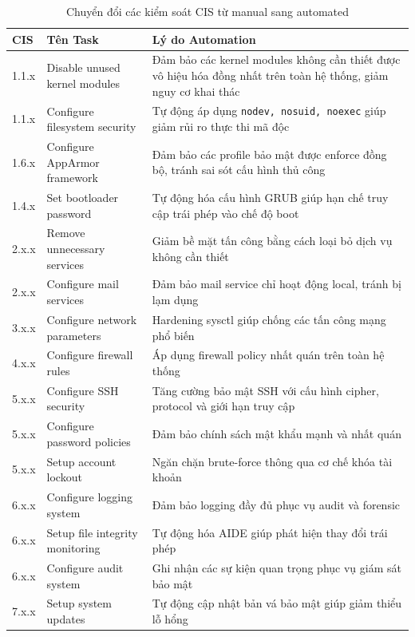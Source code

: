 \begin{table}[H]
\centering
\footnotesize
\renewcommand{\arraystretch}{1.3}
\begin{tabular}{|p{2cm}|p{5cm}|p{7cm}|}
\hline
\textbf{CIS} & \textbf{Tên Task} & \textbf{Lý do Automation} \\
\hline
1.1.x & Disable unused kernel modules & Đảm bảo các kernel modules không cần thiết được vô hiệu hóa đồng nhất trên toàn hệ thống, giảm nguy cơ khai thác \\
\hline
1.1.x & Configure filesystem security & Tự động áp dụng \texttt{nodev, nosuid, noexec} giúp giảm rủi ro thực thi mã độc \\
\hline
1.6.x & Configure AppArmor framework & Đảm bảo các profile bảo mật được enforce đồng bộ, tránh sai sót cấu hình thủ công \\
\hline
1.4.x & Set bootloader password & Tự động hóa cấu hình GRUB giúp hạn chế truy cập trái phép vào chế độ boot \\
\hline
2.x.x & Remove unnecessary services & Giảm bề mặt tấn công bằng cách loại bỏ dịch vụ không cần thiết \\
\hline
2.x.x & Configure mail services & Đảm bảo mail service chỉ hoạt động local, tránh bị lạm dụng \\
\hline
3.x.x & Configure network parameters & Hardening sysctl giúp chống các tấn công mạng phổ biến \\
\hline
4.x.x & Configure firewall rules & Áp dụng firewall policy nhất quán trên toàn hệ thống \\
\hline
5.x.x & Configure SSH security & Tăng cường bảo mật SSH với cấu hình cipher, protocol và giới hạn truy cập \\
\hline
5.x.x & Configure password policies & Đảm bảo chính sách mật khẩu mạnh và nhất quán \\
\hline
5.x.x & Setup account lockout & Ngăn chặn brute-force thông qua cơ chế khóa tài khoản \\
\hline
6.x.x & Configure logging system & Đảm bảo logging đầy đủ phục vụ audit và forensic \\
\hline
6.x.x & Setup file integrity monitoring & Tự động hóa AIDE giúp phát hiện thay đổi trái phép \\
\hline
6.x.x & Configure audit system & Ghi nhận các sự kiện quan trọng phục vụ giám sát bảo mật \\
\hline
7.x.x & Setup system updates & Tự động cập nhật bản vá bảo mật giúp giảm thiểu lỗ hổng \\
\hline
\end{tabular}
\caption{Chuyển đổi các kiểm soát CIS từ manual sang automated}
\label{tab:cis-automation}
\end{table}

